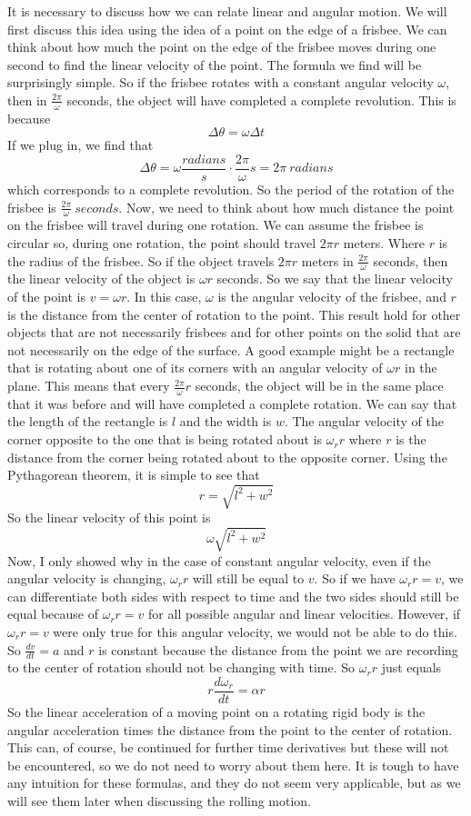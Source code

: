 \documentclass{article}[gray]
\numberwithin{equation}{subsection}
\begin{document}
It is necessary to discuss how we can relate linear and angular motion. We will first discuss this idea using the idea of a point on the edge of a frisbee. We can think about how much the point on the edge of the frisbee moves during one second to find the linear velocity of the point. The formula we find will be surprisingly simple. So if the frisbee rotates with a constant angular velocity $\omega$, then in $\frac{2\pi}{\omega}$ seconds, the object will have completed a complete revolution. This is because $$\Delta \theta=\omega \Delta t$$ If we plug in, we find that $$\Delta \theta=\omega \frac{radians}{s} \cdot \frac{2\pi}{\omega}s=2\pi \ radians$$ which corresponds to a complete revolution. So the period of the rotation of the frisbee is $\frac{2\pi}{\omega} \ seconds$. Now, we need to think about how much distance the point on the frisbee will travel during one rotation. We can assume the frisbee is circular so, during one rotation, the point should travel $2\pi r$ meters. Where $r$ is the radius of the frisbee. So if the object travels $2\pi r$ meters in $\frac{2\pi}{\omega}$ seconds, then the linear velocity of the object is $\omega r$ seconds. So we say that the linear velocity of the point is $v=\omega r$. In this case, $\omega$ is the angular velocity of the frisbee, and $r$ is the distance from the center of rotation to the point. This result hold for other objects that are not necessarily frisbees and for other points on the solid that are not necessarily on the edge of the surface. A good example might be a rectangle that is rotating about one of its corners with an angular velocity of $\omega r$ in the plane. This means that every $\frac{2\pi}{\omega}r$ seconds, the object will be in the same place that it was before and will have completed a complete rotation. We can say that the length of the rectangle is $l$ and the width is $w$. The angular velocity of the corner opposite to the one that is being rotated about is $\omega_r r$ where $r$ is the distance from the corner being rotated about to the opposite corner. Using the Pythagorean theorem, it is simple to see that $$r=\sqrt{l^2+w^2}$$ So the linear velocity of this point is $$\omega \sqrt{l^2+w^2}$$ Now, I only showed why in the case of constant angular velocity, even if the angular velocity is changing, $\omega_r r$ will still be equal to $v$. So if we have $\omega_r r=v$, we can differentiate both sides with respect to time and the two sides should still be equal because of $\omega_r r=v$ for all possible angular and linear velocities. However, if $\omega_r r=v$ were only true for this angular velocity, we would not be able to do this. So $\frac{dv}{dt}=a$ and $r$ is constant because the distance from the point we are recording to the center of rotation should not be changing with time. So $\omega_r r$ just equals $$r\frac{d\omega_r}{dt}=\alpha r$$ So the linear acceleration of a moving point on a rotating rigid body is the angular acceleration times the distance from the point to the center of rotation. This can, of course, be continued for further time derivatives but these will not be encountered, so we do not need to worry about them here. It is tough to have any intuition for these formulas, and they do not seem very applicable, but as we will see them later when discussing the rolling motion. 
\end{document}

